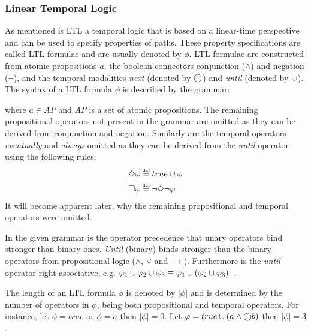 \subsubsection{Linear Temporal Logic}
\label{sec:ltl}
As mentioned is LTL a temporal logic that is based on a linear-time perspective and can be used to specify properties of paths. These property specifications are called LTL formulae and are usually denoted by $\phi$. LTL formulae are constructed from atomic propositions $a$, the boolean connectors conjunction ($\land$) and negation ($\lnot$), and the temporal modalities \emph{next} (denoted by $\bigcirc$) and \emph{until} (denoted by $\cup$). The syntax of a LTL formula $\phi$ is described by the grammar:

where $a \in AP$ and $AP$ is a set of atomic propositions. The remaining propositional operators not present in the grammar are omitted as they can be derived from conjunction and negation. Similarly are the temporal operators \emph{eventually} and \emph{always} omitted as they can be derived from the \emph{until} operator using the following rules:
\begin{align}
    &\F \phi \eqdef true \U \phi \label{eq:eventually} \\
    &\G \phi \eqdef \lnot \F \lnot \phi \label{eq:always} \\
\end{align}
It will become apparent later, why the remaining propositional and temporal operators were omitted.

In the given grammar is the operator precedence that unary operators bind stronger than binary ones. \emph{Until} (binary) binds stronger than the binary operators from propositional logic ($\land$, $\lor$ and $\to$). Furthermore is the \emph{until} operator right-associative, e.g. $\varphi_1 \cup \varphi_2 \cup \varphi_3 \equiv \varphi_1 \cup \left(\varphi_2 \cup \varphi_3\right)$~\cite{baier2008principles}.

The length of an LTL formula $\phi$ is denoted by $| \phi |$ and is determined by the number of operators in $\phi$, being both propositional and temporal operators. For instance, let $\phi= true$ or $\phi= a$ then $| \phi | = 0$. Let $\varphi= true \cup \left( a \land \bigcirc b \right)$ then $| \phi | = 3$.

